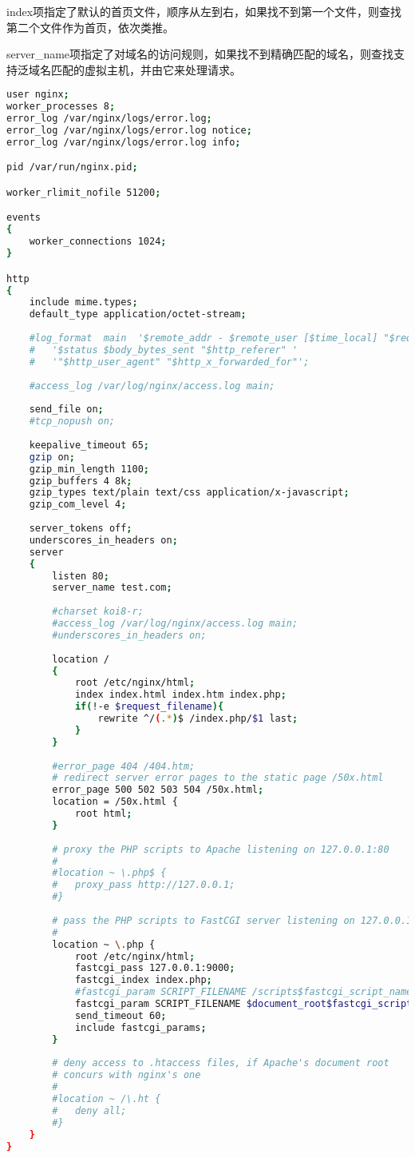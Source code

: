 \begin{compactitem}
\item index项指定了默认的首页文件，顺序从左到右，如果找不到第一个文件，则查找第二个文件作为首页，依次类推。
\item server\_name项指定了对域名的访问规则，如果找不到精确匹配的域名，则查找支持泛域名匹配的虚拟主机，并由它来处理请求。
\end{compactitem}

\begin{lstlisting}[language=bash]
user nginx;
worker_processes 8;
error_log /var/nginx/logs/error.log;
error_log /var/nginx/logs/error.log notice;
error_log /var/nginx/logs/error.log info;

pid /var/run/nginx.pid;

worker_rlimit_nofile 51200;

events
{
	worker_connections 1024;
}

http
{
	include mime.types;
	default_type application/octet-stream;
	
	#log_format  main  '$remote_addr - $remote_user [$time_local] "$request" '
	#	'$status $body_bytes_sent "$http_referer" '
	#	'"$http_user_agent" "$http_x_forwarded_for"';
	
	#access_log /var/log/nginx/access.log main;
	
	send_file on;
	#tcp_nopush on;
	
	keepalive_timeout 65;	
	gzip on;
	gzip_min_length 1100;
	gzip_buffers 4 8k;
	gzip_types text/plain text/css application/x-javascript;
	gzip_com_level 4;
	
	server_tokens off;
	underscores_in_headers on;
	server
	{
		listen 80;
		server_name test.com;
		
		#charset koi8-r;
		#access_log /var/log/nginx/access.log main;
		#underscores_in_headers on;
		
		location /
		{
			root /etc/nginx/html;
			index index.html index.htm index.php;
			if(!-e $request_filename){
				rewrite ^/(.*)$ /index.php/$1 last;
			}
		}
		
		#error_page 404 /404.htm;
		# redirect server error pages to the static page /50x.html
		error_page 500 502 503 504 /50x.html;
		location = /50x.html {
			root html;
		}
		
		# proxy the PHP scripts to Apache listening on 127.0.0.1:80
		#
		#location ~ \.php$ {
		#	proxy_pass http://127.0.0.1;
		#}
		
		# pass the PHP scripts to FastCGI server listening on 127.0.0.1:9000
		#
		location ~ \.php {
			root /etc/nginx/html;
			fastcgi_pass 127.0.0.1:9000;
			fastcgi_index index.php;
			#fastcgi_param SCRIPT_FILENAME /scripts$fastcgi_script_name;
			fastcgi_param SCRIPT_FILENAME $document_root$fastcgi_script_name;
			send_timeout 60;
			include fastcgi_params;
		}
		
		# deny access to .htaccess files, if Apache's document root
		# concurs with nginx's one
		# 
		#location ~ /\.ht {
		#	deny all;
		#}
	}
}
\end{lstlisting}

